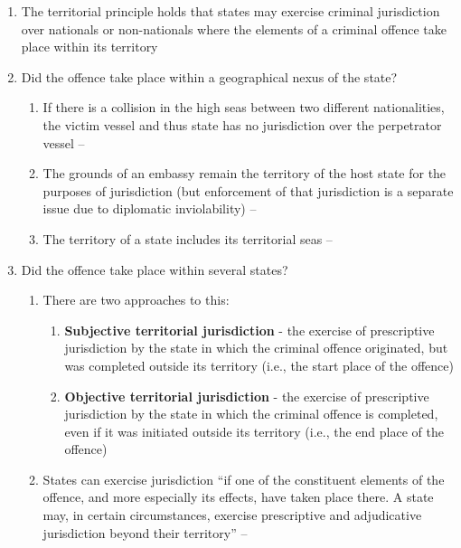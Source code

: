 \begin{enumerate}
    \begin{enumerate}
        \item The territorial principle holds that states may exercise criminal jurisdiction over nationals or non-nationals where the elements of a criminal offence take place within its territory
        \item Did the offence take place within a geographical nexus of the state?
        \begin{enumerate}
            \item If there is a collision in the high seas between two different nationalities, the victim vessel and thus state has no jurisdiction over the perpetrator vessel -- 
            \item The grounds of an embassy remain the territory of the host state for the purposes of jurisdiction (but enforcement of that jurisdiction is a separate issue due to diplomatic inviolability) -- 
            \item The territory of a state includes its territorial seas -- 
        \end{enumerate}
        \item Did the offence take place within several states?
        \begin{enumerate}
            \item There are two approaches to this:
            \begin{enumerate}
                \item \textbf{Subjective territorial jurisdiction} - the exercise of prescriptive jurisdiction by the state in which the criminal offence originated, but was completed outside its territory (i.e., the start place of the offence)
                \item \textbf{Objective territorial jurisdiction} - the exercise of prescriptive jurisdiction by the state in which the criminal offence is completed, even if it was initiated outside its territory (i.e., the end place of the offence)
            \end{enumerate}
            \item States can exercise jurisdiction ``if one of the constituent elements of the offence, and more especially its effects, have taken place there. A state may, in certain circumstances, exercise prescriptive and adjudicative jurisdiction beyond their territory'' -- 

\end{enumerate}
\end{enumerate}
\end{enumerate}
